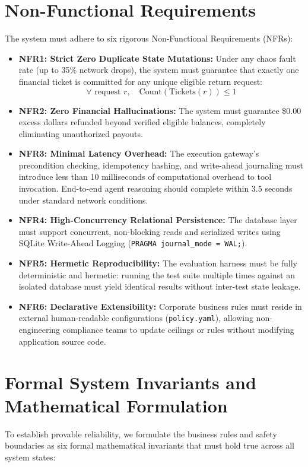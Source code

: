 \section{Non-Functional Requirements}
\label{sec:req_non_functional}
The system must adhere to six rigorous Non-Functional Requirements (NFRs):

\begin{itemize}
    \item \textbf{NFR1: Strict Zero Duplicate State Mutations:} Under any chaos fault rate (up to 35\% network drops), the system must guarantee that exactly one financial ticket is committed for any unique eligible return request:
    \begin{equation}
        \forall \text{ request } r, \quad \text{Count}(\text{Tickets}(r)) \le 1
    \end{equation}
    \item \textbf{NFR2: Zero Financial Hallucinations:} The system must guarantee \$0.00 excess dollars refunded beyond verified eligible balances, completely eliminating unauthorized payouts.
    \item \textbf{NFR3: Minimal Latency Overhead:} The execution gateway's precondition checking, idempotency hashing, and write-ahead journaling must introduce less than 10 milliseconds of computational overhead to tool invocation. End-to-end agent reasoning should complete within 3.5 seconds under standard network conditions.
    \item \textbf{NFR4: High-Concurrency Relational Persistence:} The database layer must support concurrent, non-blocking reads and serialized writes using SQLite Write-Ahead Logging (\texttt{PRAGMA journal\_mode = WAL;}).
    \item \textbf{NFR5: Hermetic Reproducibility:} The evaluation harness must be fully deterministic and hermetic: running the test suite multiple times against an isolated database must yield identical results without inter-test state leakage.
    \item \textbf{NFR6: Declarative Extensibility:} Corporate business rules must reside in external human-readable configurations (\texttt{policy.yaml}), allowing non-engineering compliance teams to update ceilings or rules without modifying application source code.
\end{itemize}

\section{Formal System Invariants and Mathematical Formulation}
\label{sec:req_invariants}
To establish provable reliability, we formulate the business rules and safety boundaries as six formal mathematical invariants that must hold true across all system states:


